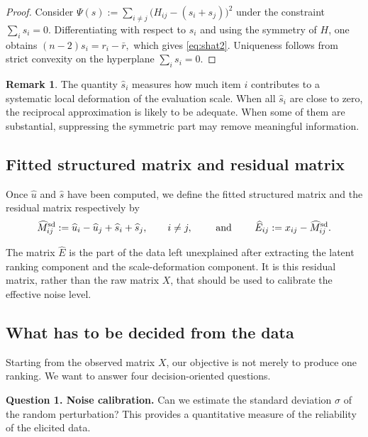 \documentclass[11pt]{amsart}
\theoremstyle{definition}
\newtheorem{remark}[definition]{Remark}
\theoremstyle{plain}
\numberwithin{equation}{section}
\begin{document}
\begin{proof}
Consider
\(
\Psi(s):=\sum_{i\neq j}\bigl(H_{ij}-(s_i+s_j)\bigr)^2
\)
under the constraint $\sum_i s_i=0$. Differentiating with respect to $s_i$ and using the symmetry of $H$, one obtains
\(
(n-2)s_i=r_i-\bar r,
\)
which gives \eqref{eq:shat2}. Uniqueness follows from strict convexity on the hyperplane $\sum_i s_i=0$.
\end{proof}

\begin{remark}
The quantity $\widehat s_i$ measures how much item $i$ contributes to a systematic local deformation of the evaluation scale. When all $\widehat s_i$ are close to zero, the reciprocal approximation is likely to be adequate. When some of them are substantial, suppressing the symmetric part may remove meaningful information.
\end{remark}

\subsection{Fitted structured matrix and residual matrix}

Once $\widehat u$ and $\widehat s$ have been computed, we define the fitted structured matrix and the residual matrix respectively by
\[
\widehat M_{ij}^{\mathrm{sd}}
:=
\widehat u_i-\widehat u_j+\widehat s_i+\widehat s_j,
\qquad i\neq j, \qquad
\hbox{ and } \qquad
\widehat E_{ij}:=x_{ij}-\widehat M_{ij}^{\mathrm{sd}}.
\]

The matrix $\widehat E$ is the part of the data left unexplained after extracting the latent ranking component and the scale-deformation component. It is this residual matrix, rather than the raw matrix $X$, that should be used to calibrate the effective noise level.
\subsection{What has to be decided from the data}

Starting from the observed matrix $X$, our objective is not merely to produce one ranking. We want to answer four decision-oriented questions.

\medskip

\noindent\textbf{Question 1. Noise calibration.}
Can we estimate the standard deviation $\sigma$ of the random perturbation? This provides a quantitative measure of the reliability of the elicited data.

\medskip
\end{document}
